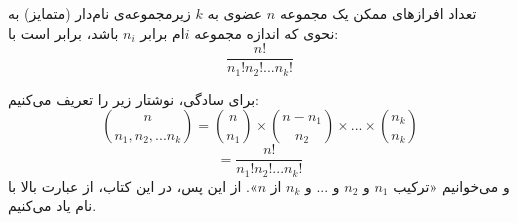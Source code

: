 \begin{THEOREM}
    \p
    تعداد افراز‌های ممکن یک مجموعه
    $n$
    عضوی به
    $k$
    زیرمجموعه‌ی نام‌دار (متمایز) به نحوی که اندازه مجموعه
    $i$ام
    برابر $n_{i}$
    باشد، برابر است با:
    $$\frac{n!}{n_{1}!n_{2}! ... n_{k}!}$$
\end{THEOREM}

\begin{DEFINITION}
    \p
    برای سادگی، نوشتار زیر را تعریف می‌کنیم:
    $${n \choose n_{1},n_{2}, ... n_{k}} = {n \choose n_{1}} \times {n-n_{1} \choose n_{2}} \times ... \times {n_{k} \choose n_{k}}$$
    $$= \frac{n!}{n_{1}!n_{2}! ... n_{k}!}$$
    و می‌خوانیم
    «ترکیب $n_1$ و $n_2$ و ... و $n_k$ از $n$».
    از این پس، در این کتاب، از عبارت بالا با نام
    یاد می‌کنیم.
\end{DEFINITION}

